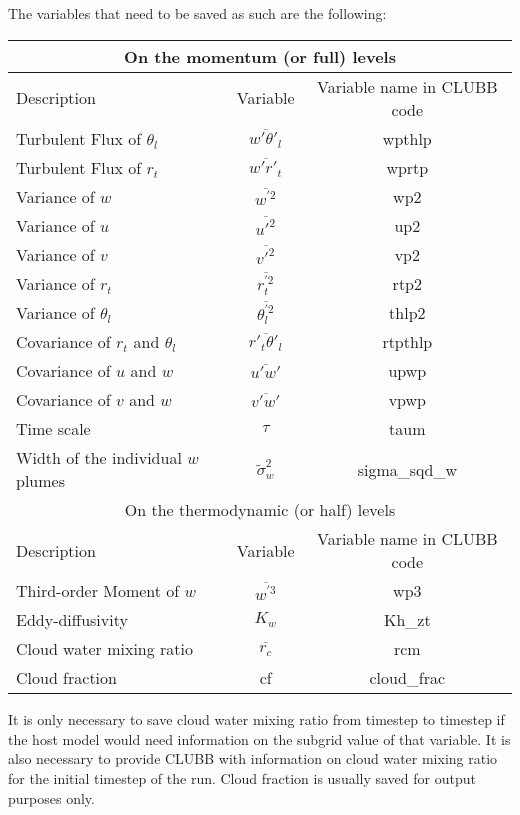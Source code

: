 \documentclass[11pt,fleqn]{article}
\begin{document}
The variables that need to be saved as such are the following:
\begin{center}
\begin{tabular} {|l|c|c|}
\hline
\multicolumn{3}{|c|}{On the momentum (or full) levels}\\\hline
Description&Variable&Variable name in CLUBB code\\\hline
Turbulent Flux of $\theta_l$&$\overline{w'\theta'_l}$&wpthlp\\\hline
Turbulent Flux of $r_t$&$\overline{w'r'_t}$&wprtp\\\hline
Variance of $w$&$\overline{w^{'2}}$&wp2\\\hline
Variance of $u$&$\overline{u'^2}$&up2\\\hline
Variance of $v$&$\overline{v'^2}$&vp2\\\hline
Variance of $r_t$&$\overline{r^{'2}_t}$&rtp2\\\hline
Variance of $\theta_l$&$\overline{\theta^{'2}_l}$&thlp2\\\hline
Covariance of $r_t$ and $\theta_l$&$\overline{r'_t\theta'_l}$&rtpthlp\\\hline
Covariance of $u$ and $w$&$\overline{u'w'}$&upwp\\\hline
Covariance of $v$ and $w$&$\overline{v'w'}$&vpwp\\\hline
Time scale&$\tau$&taum\\\hline
Width of the individual $w$ plumes&$\tilde{\sigma}^2_w$&sigma\_sqd\_w\\\hline
\multicolumn{3}{|c|}{On the thermodynamic (or half) levels}\\\hline
Description&Variable&Variable name in CLUBB code\\\hline
Third-order Moment of $w$&$\overline{w^{'3}}$&wp3\\\hline
Eddy-diffusivity &$K_{w}$&Kh\_zt\\\hline
Cloud water mixing ratio&$\overline{r_c}$&rcm\\\hline
Cloud fraction&cf&cloud\_frac\\\hline
\end{tabular}
\end{center}
It is only necessary to save cloud water mixing ratio from timestep to timestep
if the host model would need information on the subgrid value of that variable.
It is also necessary to provide CLUBB with information on cloud water mixing
ratio for the initial timestep of the run.  Cloud fraction is usually saved for
output purposes only.

%
\end{document}
